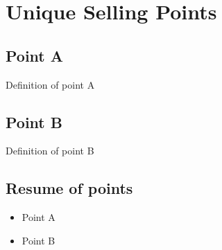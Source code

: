 %
%
%

\section{\projectname Unique Selling Points}


\subsection{Point A}
Definition of point A

\subsection{Point B}
Definition of point B


\subsection{Resume of points}

\begin{itemize}

\item Point A

\item Point B

\end{itemize}

